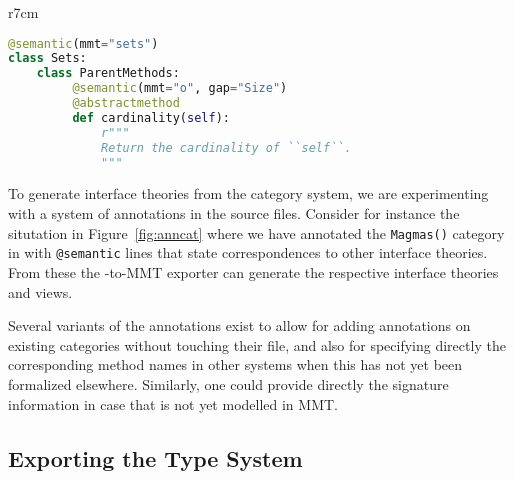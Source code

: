 \begin{wrapfigure}r{7cm}\vspace*{-2.5em}
\begin{lstlisting}[language=Python]
@semantic(mmt="sets")
class Sets:
    class ParentMethods:
         @semantic(mmt="o", gap="Size")
         @abstractmethod
         def cardinality(self):
             r"""
             Return the cardinality of ``self``.
             """
\end{lstlisting}
\vspace*{-.5em}
\caption{An anotated Category in \Sage}\label{fig:anncat}\vspace*{-1.5em}
\end{wrapfigure}
To generate interface theories from the \Sage category system, we are experimenting with a
system of annotations in the \Sage source files. Consider for instance the situtation in
Figure~\ref{fig:anncat} where we have annotated the \texttt{Magmas()} category in \Sage
with \texttt{@semantic} lines that state correspondences to other interface theories. From
these the \Sage-to-MMT exporter can generate the respective interface theories and views.

Several variants of the annotations exist to allow for adding annotations on existing
categories without touching their file, and also for specifying directly the corresponding
method names in other systems when this has not yet been formalized elsewhere. Similarly,
one could provide directly the signature information in case that is not yet modelled in
MMT.

\subsection{Exporting the \GAP Type System}

